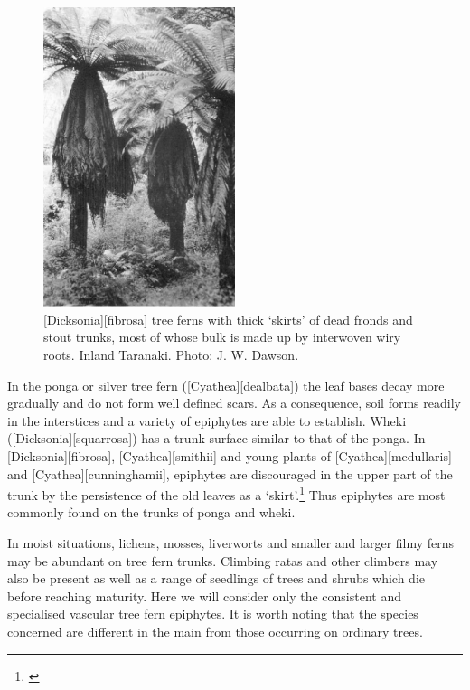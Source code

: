 \begin{figure}
	\includegraphics[width=0.5\textwidth]{graphics/figure54dicksonia-fibrosa.jpg}
	\centering
	\caption[\emph{Dicksonia fibrosa} tree ferns with thick `skirts' of dead fronds and stout trunks]{[Dicksonia][fibrosa] tree ferns with thick `skirts' of dead fronds and stout trunks, most of whose bulk is made up by interwoven wiry roots.
Inland Taranaki.
	Photo: J. W. Dawson.}%
	\label{fig:54dicksonia-fibrosa}
\end{figure}

In the ponga or silver tree fern ([Cyathea][dealbata]) the leaf bases decay more gradually and do not form well defined scars.
As a consequence, soil forms readily in the interstices and a variety of epiphytes are able to establish.
Wheki ([Dicksonia][squarrosa]) has a trunk surface similar to that of the ponga.
In [Dicksonia][fibrosa], [Cyathea][smithii] and young plants of [Cyathea][medullaris] and [Cyathea][cunninghamii],  epiphytes are discouraged in the upper part of the trunk by the persistence of the old leaves as a `skirt'.\footnote{\cite{page1986tree}}
Thus epiphytes are most commonly found on the trunks of ponga and wheki.

In moist situations, lichens, mosses, liverworts and smaller and larger filmy ferns may be abundant on tree fern trunks.
Climbing ratas and other climbers may also be present as well as a range of seedlings of trees and shrubs which die before reaching maturity.
Here we will consider only the consistent and specialised vascular tree fern epiphytes.
It is worth noting that the species concerned are different in the main from those occurring on ordinary trees.

